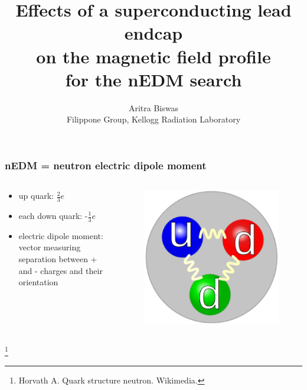 \documentclass{beamer}
\newcommand{\bottomcite}{\let\thefootnote\relax\footnote}
\begin{document}

\title{Effects of a superconducting lead endcap\\ on the magnetic field profile \\ for the nEDM search}
\author{Aritra Biswas\\Filippone Group, Kellogg Radiation Laboratory}
\maketitle

\begin{frame}
\frametitle{nEDM = neutron electric dipole moment}

    \begin{columns}

    \begin{column}{0.5\textwidth}
    \begin{itemize}
        \item up quark: $\frac{2}{3} e$
        \item each down quark: -$\frac{1}{3} e$
        \item electric dipole moment: vector measuring separation between + and - charges
              and their orientation
    \end{itemize}
    \end{column}
    
    \begin{column}{0.5\textwidth}
    \begin{figure}
    \includegraphics[width=\textwidth]{figures/neutron_quarks.eps}
    \end{figure}
    \end{column}

    \end{columns}

    \bottomcite{Horvath A. Quark structure neutron. Wikimedia.}

\end{frame}
\end{document}

